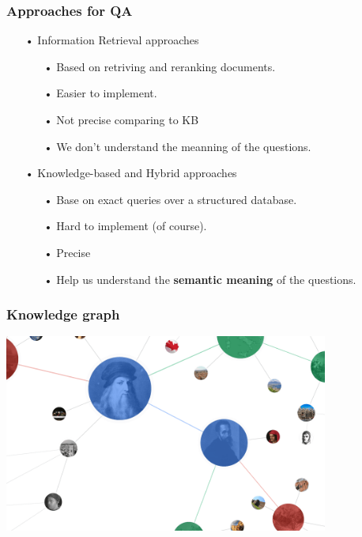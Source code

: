 \documentclass{beamer}
\begin{document}
\begin{frame}
	\frametitle{Approaches for QA}		

			
	\begin{itemize}
		\item[•] Information Retrieval approaches
			\begin{itemize}
			    \item[•] Based on retriving and reranking documents.
				\item[•] Easier to implement.
				\item[•] Not precise comparing to KB
				\item[•] We don't understand the meanning of the questions.
			\end{itemize}
		
		\item[•] Knowledge-based and Hybrid approaches
			\begin{itemize}
			\item[•] Base on exact queries over a structured database.
			\item[•] Hard to implement (of course).
			\item[•] Precise
			\item[•] Help us understand the \textbf{semantic meaning} of the questions. 
			\end{itemize}
	\end{itemize}		
		
			
\end{frame}

\begin{frame}
	\frametitle{Knowledge graph}		
			
	\begin{center} 
		\centering 
			\includegraphics[width=0.8\textwidth,height=0.8\textheight,keepaspectratio]{ggkb} 			
			\vspace{0.5cm}
	\end{center}		
		
			
\end{frame}
\end{document}

